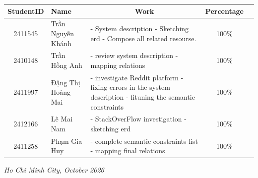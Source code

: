 \documentclass[12pt, a4paper, oneside]{article}
\begin{document}
\begin{table}[H] %
    \centering
    \renewcommand{\arraystretch}{1.8}
    \renewcommand{\tabularxcolumn}[1]{m{#1}} %
    \begin{tabularx}{\textwidth}{|c|l|X|c|>{\centering\arraybackslash}m{2.5cm}|}
        \hline
        \textbf{StudentID} & \textbf{Name} & \multicolumn{1}{c|}{\textbf{Work}} & \textbf{Percentage} \\
        \hline
        2411545 & Trần Nguyễn Khánh & 
        - System description \newline
        - Sketching erd \newline
        - Compose all related resourse. & 100\% \\
        \hline
        2410148 & Trần Hồng Anh & 
        - review system description \newline
        - mapping relations & 100\% \\
        \hline
        2411997 & Đặng Thị Hoàng Mai & 
        - investigate Reddit platform \newline
        - fixing errors in the system description \newline
        - fituning the semantic constraints
        & 100\% \\
        \hline
        2412166 & Lê Mai Nam &
        - StackOverFlow investigation \newline
        - sketching erd
        & 100\% \\
        \hline
        2411258 & Phạm Gia Huy &
        - complete semantic constraints list \newline 
        - mapping final relations 
        & 100\% \\
        \hline
    \end{tabularx}
\end{table}

\vspace{1cm}
\begin{flushright}
    \textit{Ho Chi Minh City, October 2026}
\end{flushright}

\newpage
\thispagestyle{empty}
\renewcommand{\contentsname}{\centering {TABLE OF CONTENT}}
\tableofcontents

\end{document}
